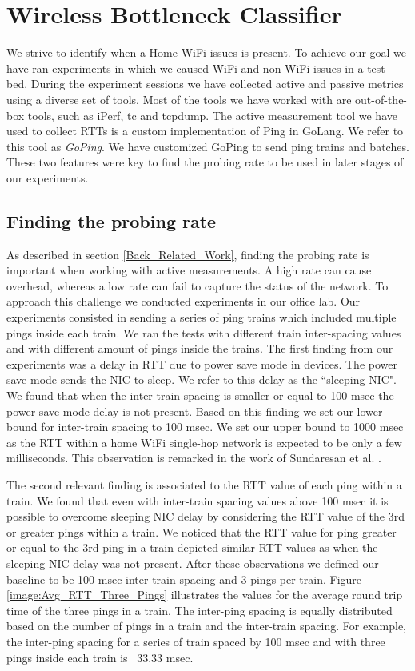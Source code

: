 \section{Wireless Bottleneck Classifier}\label{Wireless Bottleneck Detector}

We strive to identify when a Home WiFi issues is present. To achieve our goal we have ran experiments in which we caused WiFi and non-WiFi issues in a test bed.  During the experiment sessions we have collected active and passive metrics using a diverse set of tools. Most of the tools we have worked with are out-of-the-box tools, such as iPerf, tc and tcpdump. The active measurement tool we have used to collect RTTs is a custom implementation of Ping in GoLang. We refer to this tool as \emph{GoPing}. We have customized GoPing to send ping trains and batches. These two features were key to find the probing rate to be used in later stages of our experiments.

\subsection{Finding the probing rate}\label{probing_rate}

As described in section \ref{Back_Related_Work}, finding the probing rate is important when working with active measurements. A high rate can cause overhead, whereas a low rate can fail to capture the status of the network. To approach this challenge we conducted experiments in our office lab. Our experiments consisted in sending a series of ping trains which included multiple pings inside each train. We ran the tests with different train inter-spacing values and with different amount of pings inside the trains. The first finding from our experiments was a delay in RTT due to power save mode in devices. The power save mode sends the NIC to sleep. We refer to this delay as the ``sleeping NIC". We found that when the inter-train spacing is smaller or equal to 100 msec the power save mode delay is not present. Based on this finding we set our lower bound for inter-train spacing to 100 msec. We set our upper bound to 1000 msec as the RTT within a home WiFi single-hop network is expected to be only a few milliseconds. This observation is remarked in the work of Sundaresan et al. \cite{homeoraccesslink}.

The second relevant finding is associated to the RTT value of each ping within a train. We found that even with inter-train spacing values above 100 msec it is possible to overcome sleeping NIC delay by considering the RTT value of the 3rd or greater pings within a train. We noticed that the RTT value for ping greater or equal to the 3rd ping in a train depicted similar RTT values as when the sleeping NIC delay was not present. After these observations we defined our baseline to be 100 msec inter-train spacing and 3 pings per train. Figure \ref{image:Avg_RTT_Three_Pings} illustrates the values for the average round trip time of the three pings in a train. The inter-ping spacing is equally distributed based on the number of pings in a train and the inter-train spacing. For example, the inter-ping spacing for a series of train spaced by 100 msec and with three pings inside each train is ~33.33 msec.

